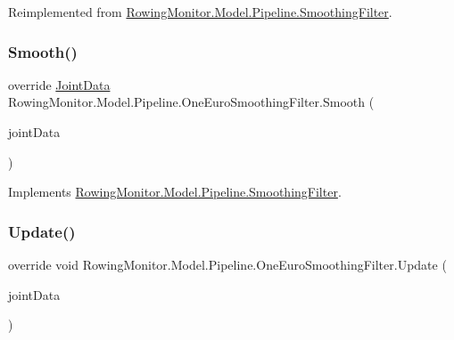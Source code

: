 Reimplemented from \hyperlink{class_rowing_monitor_1_1_model_1_1_pipeline_1_1_smoothing_filter_ac47b399ad4ae1ad899f5e571d6f6c05c}{Rowing\+Monitor.\+Model.\+Pipeline.\+Smoothing\+Filter}.

\mbox{\label{class_rowing_monitor_1_1_model_1_1_pipeline_1_1_one_euro_smoothing_filter_afd860237def583deb4499bc3c9fac868}} 
\subsubsection{\texorpdfstring{Smooth()}{Smooth()}}
{\footnotesize\ttfamily override \hyperlink{struct_rowing_monitor_1_1_model_1_1_util_1_1_joint_data}{Joint\+Data} Rowing\+Monitor.\+Model.\+Pipeline.\+One\+Euro\+Smoothing\+Filter.\+Smooth (\begin{DoxyParamCaption}\item[{\hyperlink{struct_rowing_monitor_1_1_model_1_1_util_1_1_joint_data}{Joint\+Data}}]{joint\+Data }\end{DoxyParamCaption})\hspace{0.3cm}{\ttfamily [virtual]}}



Implements \hyperlink{class_rowing_monitor_1_1_model_1_1_pipeline_1_1_smoothing_filter_a65ba6a5a48fbf5a51fb564dbeefc95fe}{Rowing\+Monitor.\+Model.\+Pipeline.\+Smoothing\+Filter}.

\mbox{\label{class_rowing_monitor_1_1_model_1_1_pipeline_1_1_one_euro_smoothing_filter_a2e518ce98440b3004aaf1af9a4eba399}} 
\subsubsection{\texorpdfstring{Update()}{Update()}}
{\footnotesize\ttfamily override void Rowing\+Monitor.\+Model.\+Pipeline.\+One\+Euro\+Smoothing\+Filter.\+Update (\begin{DoxyParamCaption}\item[{\hyperlink{struct_rowing_monitor_1_1_model_1_1_util_1_1_joint_data}{Joint\+Data}}]{joint\+Data }\end{DoxyParamCaption})\hspace{0.3cm}{\ttfamily [virtual]}}



